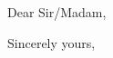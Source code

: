 \documentclass[12pt, autobio]{iitletterProf}
\date{\today}  %
\begin{document}
\begin{letter}{}

\opening{Dear Sir/Madam,}

\begin{center} \textbf{ } \end{center}


\closing{Sincerely yours,}





\end{letter}
\end{document}
